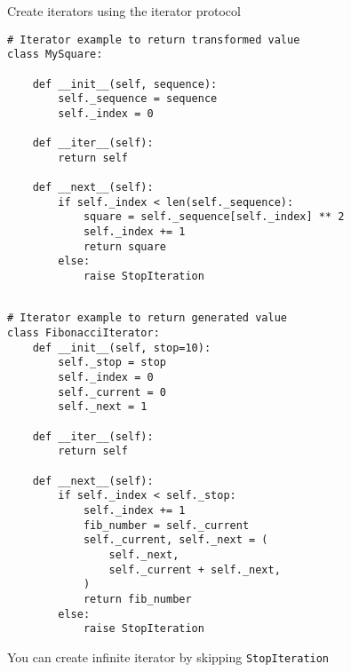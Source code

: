 \documentclass[
  ignorenonframetext,
]{beamer}
\begin{document}
\begin{frame}[fragile]{Create iterators using the iterator protocol}
\begin{verbatim}
# Iterator example to return transformed value
class MySquare:

    def __init__(self, sequence):
        self._sequence = sequence
        self._index = 0

    def __iter__(self):
        return self 
    
    def __next__(self):
        if self._index < len(self._sequence):
            square = self._sequence[self._index] ** 2
            self._index += 1
            return square 
        else:
            raise StopIteration
\end{verbatim}

\begin{verbatim}

# Iterator example to return generated value
class FibonacciIterator:
    def __init__(self, stop=10):
        self._stop = stop
        self._index = 0
        self._current = 0
        self._next = 1

    def __iter__(self):
        return self

    def __next__(self):
        if self._index < self._stop:
            self._index += 1
            fib_number = self._current
            self._current, self._next = (
                self._next,
                self._current + self._next,
            )
            return fib_number
        else:
            raise StopIteration
\end{verbatim}

You can create infinite iterator by skipping \texttt{StopIteration}
\end{frame}
\end{document}
